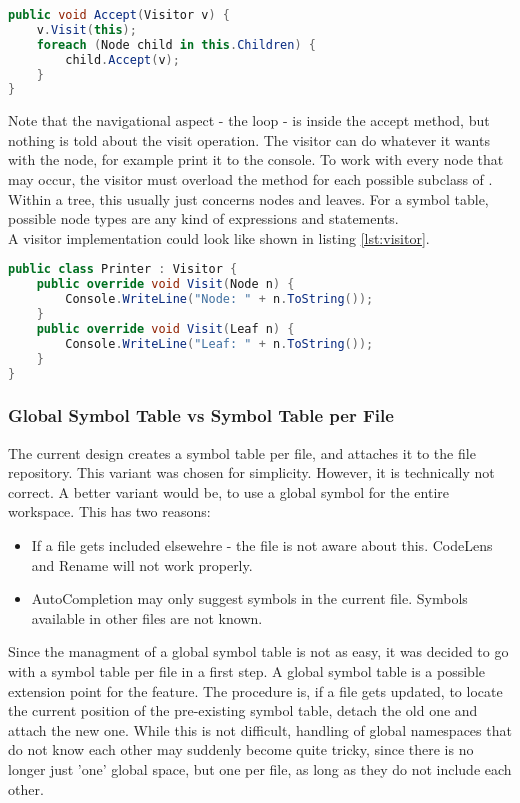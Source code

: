 \begin{lstlisting}[language=csharp, caption={Example for Accept}, captionpos=b, label={lst:accept}]
public void Accept(Visitor v) {
    v.Visit(this);
    foreach (Node child in this.Children) {
        child.Accept(v);
    }
}
\end{lstlisting}

Note that the navigational aspect - the  loop - is inside the accept method, but nothing is told about the visit operation.
The visitor can do whatever it wants with the node, for example print it to the console.
To work with every node that may occur, the visitor must overload the  method for each possible subclass of .
Within a tree, this usually just concerns nodes and leaves.
For a symbol table, possible node types are any kind of expressions and statements.\\

A visitor implementation could look like shown in listing \ref{lst:visitor}.

\begin{lstlisting}[language=csharp, caption={Example for Visitor}, captionpos=b, label={lst:visitor}]
public class Printer : Visitor {
    public override void Visit(Node n) {
        Console.WriteLine("Node: " + n.ToString());
    }
    public override void Visit(Leaf n) {
        Console.WriteLine("Leaf: " + n.ToString());
    }
}
\end{lstlisting}

\subsubsection{Global Symbol Table vs Symbol Table per File}
\label{section:globalSymbolTable}
The current design creates a symbol table per file, and attaches it to the file repository.
This variant was chosen for simplicity.
However, it is technically not correct.
A better variant would be, to use a global symbol for the entire workspace.
This has two reasons:
\begin{itemize}
    \item If a file gets included elsewehre - the file is not aware about this. CodeLens and Rename will not work properly.
    \item AutoCompletion may only suggest symbols in the current file. Symbols available in other files are not known.
\end{itemize}

Since the managment of a global symbol table is not as easy, it was decided to go with a symbol table per file in a first step.
A global symbol table is a possible extension point for the feature.
The procedure is, if a file gets updated, to locate the current position of the pre-existing symbol table, detach the old one and attach the new one.
While this is not difficult, handling of global namespaces that do not know each other may suddenly become quite tricky,
since there is no longer just 'one' global space, but one per file, as long as they do not include each other.\\


